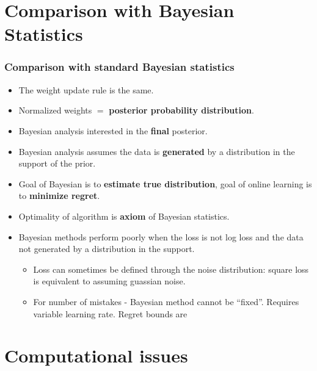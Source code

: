 \documentclass[handout]{beamer}
\begin{document}
\section{Comparison with Bayesian Statistics}

\begin{frame}
\frametitle{Comparison with standard Bayesian statistics}
\begin{itemize}
\item The weight update rule is the same.
\item Normalized weights $=$ {\bf posterior probability  distribution}.
\item Bayesian analysis interested in the {\bf final} posterior.
\item Bayesian analysis assumes the data is {\bf generated} 
by a distribution in the support of the prior.
\item Goal of Bayesian is to {\bf estimate true distribution}, 
goal of online learning is to {\bf minimize regret}.
\item Optimality of algorithm is {\bf axiom} of Bayesian statistics.
\item Bayesian methods perform poorly when the loss is not log loss
  and the data not generated by a distribution in the support.
\begin{itemize}
\item
Loss can sometimes be defined through the noise distribution: square loss is equivalent to assuming guassian noise.
\item
For number of mistakes - Bayesian method cannot be ``fixed''. Requires
variable learning rate. Regret bounds are 
\end{itemize}
\end{itemize}
\end{frame}


\section{Computational issues}
\end{document}
